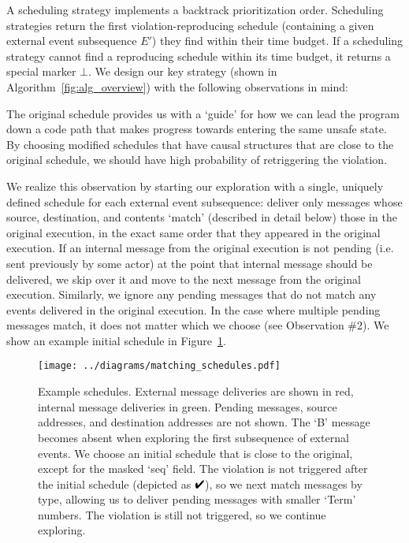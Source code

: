 A scheduling strategy implements a backtrack prioritization order.
Scheduling strategies return the first violation-reproducing schedule
(containing a given external event subsequence $E'$) they
find within their time budget. If a scheduling strategy cannot find a
reproducing schedule within its time budget, it returns a special marker $\bot$.
We design our key strategy (shown in
Algorithm~\ref{fig:alg_overview})
with the following observations in mind:

 The original schedule
provides us with a
`guide' for how we can lead the program down a code path that makes progress towards
entering the same unsafe state. By choosing modified schedules that have causal
structures that are close to the original schedule, we should have high
probability of retriggering the violation.

We realize this observation by starting our exploration with a single, uniquely
defined schedule for each external event subsequence: deliver only messages
whose source, destination, and contents
`match' (described in detail below) those in the original execution, in the exact same order
that they appeared in the original execution. If an internal message from the
original execution is not pending (i.e. sent previously by some actor) at the
point that internal message should be delivered, we skip over it and
move to the next message from the original execution. Similarly, we
ignore any pending messages that do not match any events delivered in the original
execution. In the case where multiple pending messages match, it does not
matter which we choose (see Observation \#2).
We show an example initial
schedule in Figure~\ref{fig:matching}.

\begin{figure}[tb!]
    \centering
    \texttt{[image: ../diagrams/matching\_schedules.pdf]}
    \caption{\label{fig:matching} Example schedules. External
    message deliveries are shown in red, internal message deliveries in green. Pending
    messages, source addresses, and destination addresses are not shown. The `B' message
    becomes absent when exploring the first subsequence of external
    events. We choose an initial schedule that is close to the original,
    except for the masked `seq' field. The violation is not triggered after
    the initial schedule (depicted as $\PASS$), so we next match messages by type,
    allowing us to deliver pending messages with smaller `Term' numbers. The violation is still not triggered, so we continue exploring.}
\end{figure}

